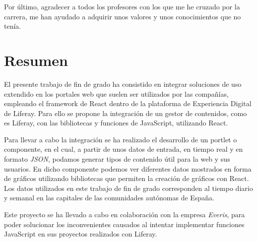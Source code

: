 \documentclass[a4paper, 12pt]{book}
\begin{document}
\vspace{5mm}
Por último, agradecer a todos los profesores con los que me he cruzado por la carrera, me han ayudado a adquirir unos valores y unos conocimientos que no tenía.




\chapter*{Resumen}
El presente trabajo de fin de grado ha consistido en integrar soluciones de uso extendido en los portales web que suelen ser utilizados por las compañías, empleando el framework de React dentro de la plataforma de Experiencia Digital de Liferay. Para ello se propone la integración de un gestor de contenidos, como es Liferay, con las bibliotecas y funciones de JavaScript, utilizando React.

\vspace{5mm}
Para llevar a cabo la integración se ha realizado el desarrollo de un portlet o componente, en el cual, a partir de unos datos de entrada, en tiempo real y en formato \textit{JSON}, podamos generar tipos de contenido útil para la web y sus usuarios. En dicho componente podemos ver diferentes datos mostrados en forma de gráficos utilizando bibliotecas que permiten la creación de gráficos con React. Los datos utilizados en este trabajo de fin de grado corresponden al tiempo diario y semanal en las capitales de las comunidades autónomas de España.

\vspace{5mm}
Este proyecto se ha llevado a cabo en colaboración con la empresa \textit{Everis}, para poder solucionar los inconvenientes causados al intentar implementar funciones JavaScript en sus proyectos realizados con Liferay.





\end{document}
